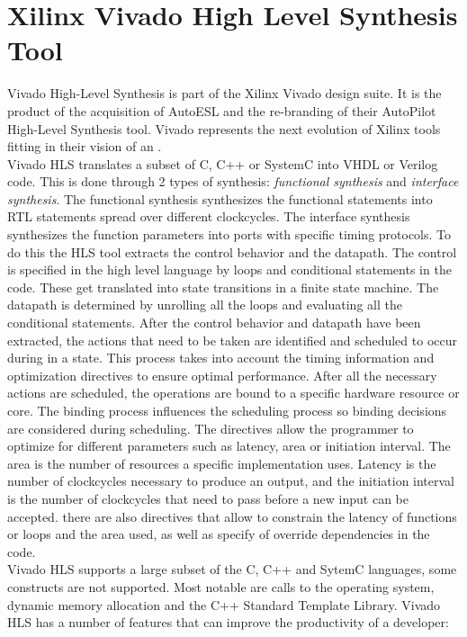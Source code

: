 \section{Xilinx Vivado High Level Synthesis Tool}
\label{sec:vivado_HLS}
Vivado High-Level Synthesis is part of the Xilinx Vivado design suite. It is the product of the acquisition of AutoESL and the re-branding of their AutoPilot High-Level Synthesis tool. Vivado represents the next evolution of Xilinx tools fitting in their vision of an .\\
Vivado HLS translates a subset of C, C++ or SystemC into VHDL or Verilog code. This is done through 2 types of synthesis: \emph{functional synthesis} and \emph{interface synthesis}. The functional synthesis synthesizes the functional statements into RTL statements spread over different clockcycles. The interface synthesis synthesizes the function parameters into ports with specific timing protocols. To do this the HLS tool extracts the control behavior and the datapath. The control is specified in the high level language by loops and conditional statements in the code. These get translated into state transitions in a finite state machine. The datapath is determined by unrolling all the loops and evaluating all the conditional statements. After the control behavior and datapath have been extracted, the actions that need to be taken are identified and scheduled to occur during in a state. This process takes into account the timing information and optimization directives to ensure optimal performance. After all the necessary actions are scheduled, the operations are bound to a specific hardware resource or core. The binding process influences the scheduling process so binding decisions are considered during scheduling. The directives allow the programmer to optimize for different parameters such as latency, area or initiation interval. The area is the number of resources a specific implementation uses. Latency is the number of clockcycles necessary to produce an output, and the initiation interval is the number of clockcycles that need to pass before a new input can be accepted. there are also directives that allow to constrain the latency of functions or loops and the area used, as well as specify of override dependencies in the code.\\
Vivado HLS supports a large subset of the C, C++ and SytemC languages, some constructs are not supported. Most notable are calls to the operating system, dynamic memory allocation and the C++ Standard Template Library. 
Vivado HLS has a number of features that can improve the productivity of a developer:

